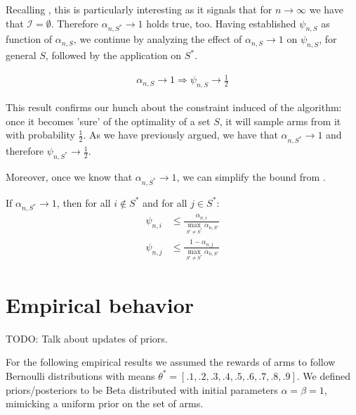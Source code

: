 Recalling , this is particularly interesting as it signals that for $n \rightarrow \infty$ we have that $\mathcal{I} = \emptyset$. Therefore $\alpha_{n, S^*} \rightarrow 1$ holds true, too.
Having established $\psi_{n, S}$ as function of $\alpha_{n, S}$, we continue by analyzing the effect of $\alpha_{n, S} \rightarrow 1$ on $\psi_{n, S}$, for general $S$, followed by the application on $S^*$.
\begin{lemma}\label{lemma:psi_convergence}
  \begin{align}
    \alpha_{n, S} \rightarrow 1 \Rightarrow \psi_{n, S} \rightarrow \frac{1}{2}
  \end{align}
\end{lemma}
This result confirms our hunch about the constraint induced of the algorithm:
once it becomes 'sure' of the optimality of a set $S$, it will sample arms from
it with probability $\frac{1}{2}$. As we have previously argued, we have that
$\alpha_{n, S^*} \rightarrow 1$ and therefore $\psi_{n, S^*} \rightarrow
\frac{1}{2}$.

Moreover, once we know that $\alpha_{n, S^*} \rightarrow 1$, we can simplify the
bound from .
\begin{lemma}\label{lemma:measurement_plan_bound_max}
  If $\alpha_{n, S^*} \rightarrow 1$, then for all $i \notin S^*$ and for all
  $j \in S^*$:
  \begin{align}
    \psi_{n, i} &\leq \frac{\alpha_{n, i}}{\max_{S' \neq S^*} \alpha_{n, S'}} \\
    \psi_{n, j} &\leq \frac{1 - \alpha_{n, j}}{\max_{S' \neq S^*} \alpha_{n,
        S'}}
  \end{align}
\end{lemma}

\section{Empirical behavior}\label{section:empirical_behavior}

TODO: Talk about updates of priors.

For the following empirical results we assumed the rewards of arms to follow
Bernoulli distributions with means $\theta^* = [.1, .2, .3, .4, .5, .6, .7, .8,
.9]$. We defined priors/posteriors to be Beta distributed with initial
parameters $\alpha = \beta = 1$, mimicking a uniform prior on the set of arms.

